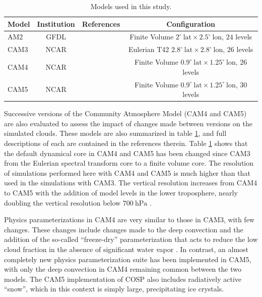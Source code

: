 \begin{table}
    \centering
    \begin{tabular}{lccc}
        \hline
        Model & Institution & References                            & Configuration \\ \hline
        AM2     & GFDL                & \cite{am2_evaluation}     & Finite Volume $2^{\circ} ~\text{lat} \times 2.5^{\circ} ~\text{lon}$, $24$ levels \\ 
        CAM3    & NCAR                & \cite{cam3_description} & Eulerian T42 $2.8^{\circ} ~\text{lat} \times 2.8^{\circ} ~\text{lon}$, $26$ levels \\
        CAM4    & NCAR                & \cite{cam4_description} & Finite Volume $0.9^{\circ} ~\text{lat} \times 1.25^{\circ} ~\text{lon}$, $26$ levels \\
        CAM5    & NCAR                & \cite{cam5_description} & Finite Volume $0.9^{\circ} ~\text{lat} \times 1.25^{\circ} ~\text{lon}$, $30$ levels \\ \hline
    \end{tabular}
    \caption{Models used in this study.}
    \label{models}
\end{table}

Successive versions of the Community Atmosphere Model (CAM4 and CAM5) are also evaluated to assess the impact of changes made between versions on the simulated clouds. These models are also summarized in table \ref{models}, and full descriptions of each are contained in the references therein. Table \ref{models} shows that the default dynamical core in CAM4 and CAM5 has been changed since CAM3 from the Eulerian spectral transform core to a finite volume core. The resolution of simulations performed here with CAM4 and CAM5 is much higher than that used in the simulations with CAM3. The vertical resolution increases from CAM4 to CAM5 with the addition of model levels in the lower troposphere, nearly doubling the vertical resolution below $700~\text{hPa}$ \citep{medeiros_et_al_2011}.

Physics parameterizations in CAM4 are very similar to those in CAM3, with few changes. These changes include changes made to the deep convection \citep{neale_et_al_2008,richter_and_rasch_2008} and the addition of the so-called ``freeze-dry'' parameterization that acts to reduce the low cloud fraction in the absence of significant water vapor \citep{vavrus_and_waliser_2008}. In contrast, an almost completely new physics parameterization suite has been implemented in CAM5, with only the deep convection in CAM4 remaining common between the two models. The CAM5 implementation of COSP also includes radiatively active ``snow'', which in this context is simply large, precipitating ice crystals.

